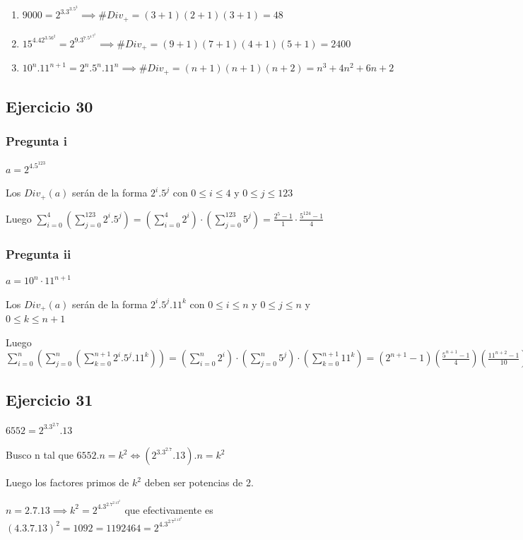 \begin{enumerate}
    \item $ 9000 = 2^3.3^3.5^3 \implies \#Div_+ = (3+1)(2+1)(3+1) = 48$
    \item $ 15^4.42^3.56^2 = 2^9.3^7.5^4.7^5 \implies \#Div_+ = (9+1)(7+1)(4+1)(5+1) = 2400 $ 
    \item $ 10^n.11^{n+1} = 2^n.5^n.11^n \implies \#Div_+ = (n+1)(n+1)(n+2) = n^3 + 4n^2+6n+2$ 
\end{enumerate}

\subsection{Ejercicio 30}
\subsubsection{Pregunta i}

$ a = 2^4.5^123 $

Los $ Div_+(a) $ serán de la forma $ 2^i . 5^j $ con $ 0\leq i \leq 4 $ y $ 0\leq j \leq 123 $

Luego $ \sum_{i=0}^{4}\left( \sum_{j=0}^{123}2^i.5^j \right) = \left( \sum_{i=0}^{4}2^i \right) \cdot \left( \sum_{j=0}^{123}5^j \right) = \frac{2^5 - 1}{1} \cdot \frac{5^124 - 1}{4} $

\subsubsection{Pregunta ii}
$ a = 10^n \cdot 11^{n+1} $

Los $ Div_+(a) $ serán de la forma $ 2^i . 5^j . 11^k $ con $ 0\leq i \leq n $ y $ 0\leq j \leq n $ y $ 0\leq k \leq n+1 $

Luego $ \sum_{i=0}^{n}\left( \sum_{j=0}^{n} \left( \sum_{k=0}^{n+1} 2^i.5^j.11^k \right) \right) = \left( \sum_{i=0}^{n}2^i \right) \cdot \left( \sum_{j=0}^{n}5^j \right) \cdot \left( \sum_{k=0}^{n+1}11^k \right) = (2^{n+1} - 1)(\frac{5^{n+1}-1}{4})(\frac{11^{n+2}-1}{10})$

\subsection{Ejercicio 31}
$ 6552 = 2^3.3^2.7.13 $

Busco n tal que $ 6552 . n = k^2 \iff (2^3.3^2.7.13).n = k^2 $

Luego los factores primos de $ k^2 $ deben ser potencias de 2.

$ n = 2.7.13 \implies k^2 = 2^4.3^2.7^2.13^2 $ que efectivamente es $ (4.3.7.13)^2 = 1092 = 1192464 = 2^4.3^2.7^2.13^2 $

